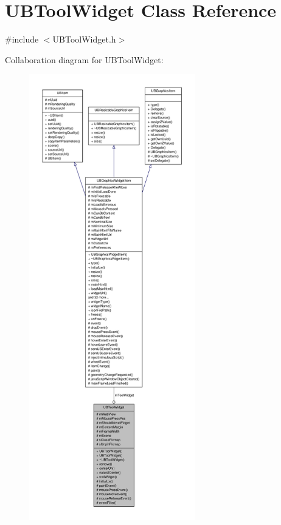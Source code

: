 \hypertarget{class_u_b_tool_widget}{\section{U\-B\-Tool\-Widget Class Reference}
\label{dc/de3/class_u_b_tool_widget}
}


{\ttfamily \#include $<$U\-B\-Tool\-Widget.\-h$>$}



Collaboration diagram for U\-B\-Tool\-Widget\-:
\nopagebreak
\begin{figure}[H]
\begin{center}
\leavevmode
\includegraphics[height=550pt]{d3/d18/class_u_b_tool_widget__coll__graph}
\end{center}
\end{figure}
